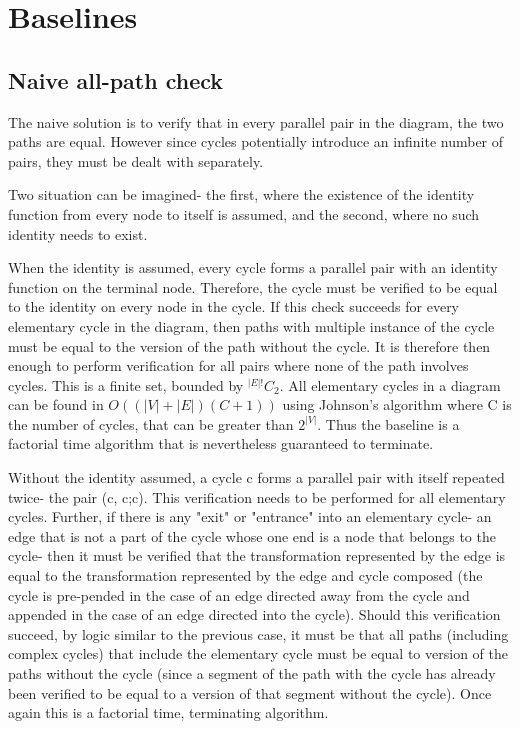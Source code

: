 \documentclass{article}
\begin{document}
\section{Baselines}

\subsection{Naive all-path check}
The naive solution is to verify that in every parallel pair in the diagram, the two paths are equal. However since cycles potentially introduce an infinite number of pairs, they must be dealt with separately.

Two situation can be imagined- the first, where the existence of the identity function from every node to itself is assumed, and the second, where no such identity needs to exist.

When the identity is assumed, every cycle forms a parallel pair with an identity function on the terminal node. Therefore, the cycle must be verified to be equal to the identity on every node in the cycle. If this check succeeds for every elementary cycle in the diagram, then paths with multiple instance of the cycle must be equal to the version of the path without the cycle. It is therefore then enough to perform verification for all pairs where none of the path involves cycles. This is a finite set, bounded by $^{|E|!}C_2$. All elementary cycles in a diagram can be found in $O((|V|+|E|)(C+1))$ using Johnson's algorithm where C is the number of cycles, that can be greater than $2^{|V|}$. Thus the baseline is a factorial time algorithm that is nevertheless guaranteed to terminate.

Without the identity assumed, a cycle c forms a parallel pair with itself repeated twice- the pair (c, c;c). This verification needs to be performed for all elementary cycles. Further, if there is any "exit" or "entrance" into an elementary cycle- an edge that is not a part of the cycle whose one end is a node that belongs to the cycle- then it must be verified that the transformation represented by the edge is equal to the transformation represented by the edge and cycle composed (the cycle is pre-pended in the case of an edge directed away from the cycle and appended in the case of an edge directed into the cycle). Should this verification succeed, by logic similar to the previous case, it must be that 
all paths (including complex cycles) that include the elementary cycle must be equal to version of the paths without the cycle (since a segment of the path with the cycle has already been verified to be equal to a version of that segment without the cycle). Once again this is a factorial time, terminating algorithm.
\end{document}

